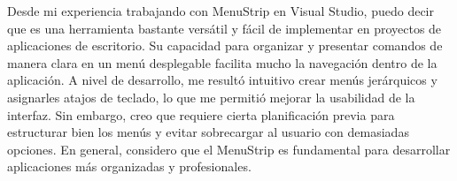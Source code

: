 Desde mi experiencia trabajando con MenuStrip en Visual Studio, puedo decir que es una herramienta bastante versátil y fácil de implementar en proyectos de aplicaciones de escritorio. Su capacidad para organizar y presentar comandos de manera clara en un menú desplegable facilita mucho la navegación dentro de la aplicación. A nivel de desarrollo, me resultó intuitivo crear menús jerárquicos y asignarles atajos de teclado, lo que me permitió mejorar la usabilidad de la interfaz. Sin embargo, creo que requiere cierta planificación previa para estructurar bien los menús y evitar sobrecargar al usuario con demasiadas opciones. En general, considero que el MenuStrip es fundamental para desarrollar aplicaciones más organizadas y profesionales.